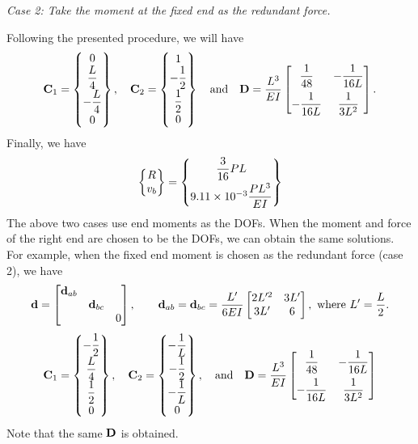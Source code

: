 \begin{example}[Beam]
\emph{Case 2: Take the moment at the fixed end as the redundant force.}
\begin{fig}
  
\end{fig}
Following the presented procedure, we will have
\begin{equation*}
  \mathbf{C}_1 = \begin{Bmatrix}0\\ \dfrac L4\\[4pt] -\dfrac L4\\[4pt] 0\end{Bmatrix},\quad \mathbf{C}_2 = \begin{Bmatrix}1\\ -\dfrac12\\[4pt] \dfrac12\\[4pt] 0\end{Bmatrix}\quad\text{and}\quad \mathbf{D} = \frac{L^3}{EI}\begin{bmatrix}\dfrac{1}{48} & -\dfrac{1}{16L}\\[8pt] -\dfrac{1}{16L} & \dfrac{1}{3L^2}\end{bmatrix}.
\end{equation*}
Finally, we have
\begin{equation*}
  \begin{Bmatrix}R\\ v_b\end{Bmatrix} = \begin{Bmatrix}\dfrac{3}{16}PL\\[6pt] 9.11\times10^{-3}\dfrac{PL^3}{EI}\end{Bmatrix}
\end{equation*}
The above two cases use end moments as the DOFs. When the moment and force of the right end are chosen to be the DOFs, we can obtain the same solutions. For example, when the fixed end moment is chosen as the redundant force (case 2), we have
\begin{equation*}
  \mathbf{d} = \begin{bmatrix}\mathbf{d}_{ab} & & \\ & \mathbf{d}_{bc} & \\ & & 0\end{bmatrix},\qquad \mathbf{d}_{ab} = \mathbf{d}_{bc} = \frac{L'}{6EI}\begin{bmatrix}2L'^2 & 3L'\\ 3L' & 6\end{bmatrix},\ \text{where } L' = \frac L2.
\end{equation*}
\begin{equation*}
  \mathbf{C}_1 = \begin{Bmatrix}-\dfrac12\\[4pt] \dfrac L4\\[4pt] \dfrac12\\[4pt] 0\end{Bmatrix},\quad \mathbf{C}_2 = \begin{Bmatrix}-\dfrac1L\\[4pt] -\dfrac12\\[4pt] -\dfrac1L\\[4pt] 0\end{Bmatrix},\quad\text{and}\quad \mathbf{D} = \frac{L^3}{EI}\begin{bmatrix}\dfrac{1}{48} & -\dfrac{1}{16L}\\[8pt] -\dfrac{1}{16L} & \dfrac{1}{3L^2}\end{bmatrix}
\end{equation*}
Note that the same $\mathbf{D}$ is obtained.
\end{example}

